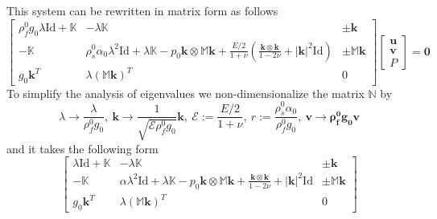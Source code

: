\documentclass[12pt]{article}
\numberwithin{theorem}{section}
\begin{document}
This system can be rewritten in matrix form as follows
\begin{equation}
\left[ 
\begin{array}{ccc} 
\rho_f^0g_0\lambda \mathrm{Id} + \mathbb{K} & -\lambda \mathbb{K} & \pm\mathbf{k}\\
-\mathbb{K}&\rho_s^0\alpha_0\lambda^2\mathrm{Id}+\lambda\mathbb{K} - p_0\mathbf{k}\otimes\mathbb{M}\mathbf{k} + \frac{E/2}{1+\nu}\left(\frac{\mathbf{k\otimes k}}{1-2\nu}+|\mathbf{k}|^2\mathrm{Id}\right) & \pm\mathbb{M}\mathbf{k}\\
g_0\mathbf{k}^T & \lambda(\mathbb{M}\mathbf{k})^T & 0
\end{array} 
\right] 
\left[\begin{array}{c} 
\mathbf{u} \\ \mathbf{v} \\ P
\end{array} 
\right]=\mathbf{0} 
\end{equation}
 To simplify the analysis of eigenvalues we non-dimensionalize the matrix $\mathbb{N}$ by 
 \begin{equation}
 \lambda \rightarrow \frac{\lambda}{\rho_f^0g_0},
 \ \mathbf{k}\rightarrow \frac1{\sqrt{\mathcal{E}\rho_f^0g_0}}\mathbf{k}, \ \mathcal{E}:=\frac{E/2}{1+\nu},\ r:=\frac{\rho_s^0 \alpha_0}{\rho_f^0g_0}, \ \mathbf{v}\rightarrow\mathbf{\rho_f^0g_0v}
 \end{equation} and it takes the following form 
\begin{equation}
\left[ 
\begin{array}{ccc} 
\lambda \mathrm{Id} + \mathbb{K} & -\lambda \mathbb{K} & \pm\mathbf{k}\\
-\mathbb{K}&\alpha\lambda^2\mathrm{Id}+\lambda\mathbb{K} - p_0\mathbf{k}\otimes\mathbb{M}\mathbf{k} + \frac{\mathbf{k\otimes k}}{1-2\nu}+|\mathbf{k}|^2\mathrm{Id} & \pm\mathbb{M}\mathbf{k}\\
g_0\mathbf{k}^T & \lambda(\mathbb{M}\mathbf{k})^T & 0
\end{array} 
\right] 
\end{equation}
\end{document}
